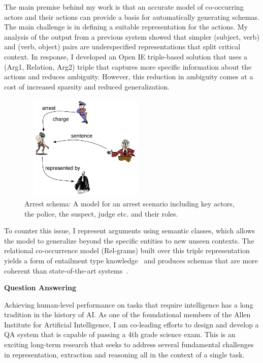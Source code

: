 \documentclass[a4paper,11pt,onecolumn]{article}
\begin{document}
The main premise behind my work is that an accurate model of co-occurring actors and their actions can provide a basis for automatically generating schemas. The main challenge is in defining a suitable representation for the actions. My analysis of the output from a previous system showed that simpler (subject, verb) and (verb, object) pairs are underspecified representations that split critical context. In response, I developed an Open IE triple-based solution that uses a (Arg1, Relation, Arg2) triple that captures more specific information about the actions and reduces ambiguity. However, this reduction in ambiguity comes at a cost of increased sparsity and reduced generalization. 
\begin{figure}
	\vspace{-2ex}
	\begin{center}
	\includegraphics[width=2.5in,height=2in]{figures/arrest-scenario} 	
	\vspace{-2ex}
	\caption{\label{fig:arrest} {\small Arrest schema: A model for an arrest scenario including key actors, the police, the suspect, judge etc. and their roles.}}
	\vspace{-2ex}
	\end{center}
\end{figure}
To counter this issue, I represent arguments using semantic classes, which allows the model to generalize beyond the specific entities to new unseen contexts. The relational co-occurrence model (Rel-grams) built over this triple representation yields a form of entailment type knowledge~\cite{balasubramanian-akbc12} and produces schemas that are more coherent than state-of-the-art systems~\cite{balasubramanian-emnlp13}.

{\bf Question Answering}

Achieving human-level performance on tasks that require intelligence has a long tradition in the history of AI. As one of the foundational members of the Allen Institute for Artificial Intelligence, I am co-leading efforts to design and develop a QA system that is capable of passing a 4th grade science exam. This is an exciting long-term research that seeks to address several fundamental challenges in representation, extraction and reasoning all in the context of a single task.
\end{document}

